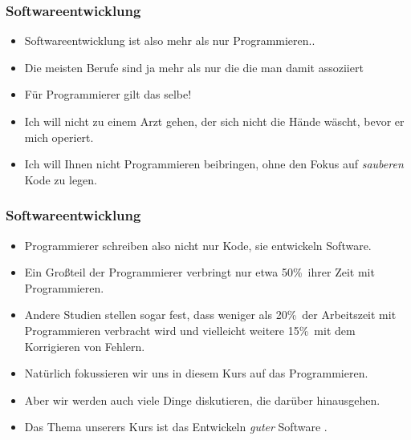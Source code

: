 \documentclass[aspectratio=169,mathserif,notheorems]{beamer}%
\begin{document}
\begin{frame}%
\frametitle{Softwareentwicklung}%
\begin{itemize}%
\item Softwareentwicklung ist also mehr als nur Programmieren..%
\item<2-> Die meisten Berufe sind ja mehr als nur die  die man damit assoziiert%
\item<6-> Für Programmierer gilt das selbe!%
\item<10-> Ich will nicht zu einem Arzt gehen, der sich nicht die Hände wäscht, bevor er mich operiert.%
\item<11-> Ich will Ihnen nicht Programmieren beibringen, ohne den Fokus auf \emph{sauberen} Kode zu legen.%
\end{itemize}%
\end{frame}%
%
\begin{frame}%
\frametitle{Softwareentwicklung}%
%
\begin{itemize}%
\item Programmierer schreiben also nicht nur Kode, sie entwickeln Software.%
\item<2-> Ein Großteil der Programmierer verbringt nur etwa 50\%~ihrer Zeit mit Programmieren\cite{T2019MOSWBFDHOT2TMOSS,AS2019DS2OSRP}.%
\item<3-> Andere Studien stellen sogar fest, dass weniger als 20\%~der Arbeitszeit mit Programmieren verbracht wird und vielleicht weitere 15\%~mit dem Korrigieren von Fehlern\cite{MAGTOC2024EHFAP}.%
%
\item<4-> Natürlich fokussieren wir uns in diesem Kurs auf das Programmieren.%
%
\item<5-> Aber wir werden auch viele Dinge diskutieren, die darüber hinausgehen.
%
\item<8-> Das Thema unserers Kurs ist das Entwickeln \emph{guter} Software .%
\end{itemize}%
\end{frame}%
%
%
\end{document}

